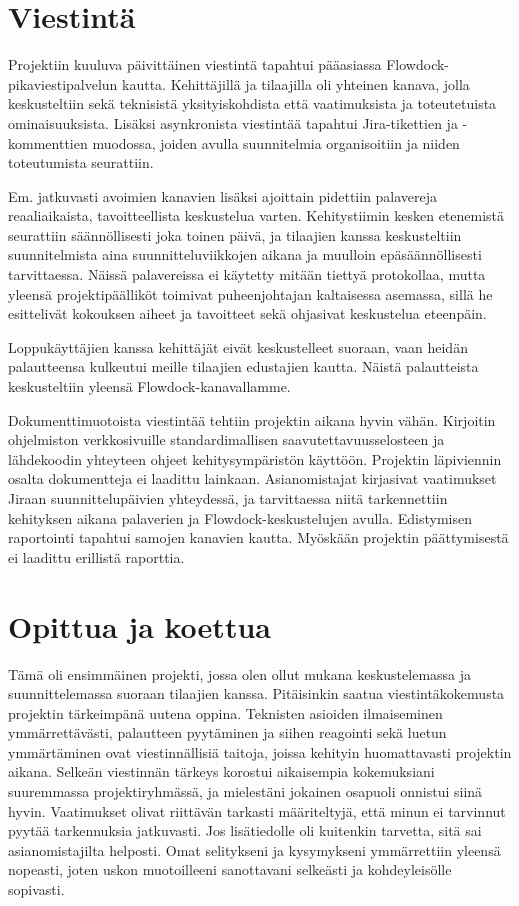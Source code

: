 \documentclass[11pt]{article}
\begin{document}
\section{Viestintä}

Projektiin kuuluva päivittäinen viestintä tapahtui pääasiassa
Flowdock-pikaviestipalvelun kautta. Kehittäjillä ja tilaajilla oli yhteinen
kanava, jolla keskusteltiin sekä teknisistä yksityiskohdista että vaatimuksista
ja toteutetuista ominaisuuksista. Lisäksi asynkronista vies\-tintää tapahtui
Jira-tikettien ja -kommenttien muodossa, joiden avulla suun\-nitelmia orga\-ni\-soitiin
ja niiden toteutumista seurattiin.

Em. jatkuvasti avoimien kanavien lisäksi ajoittain pidettiin palavereja
reaaliaikaista, tavoitteellista keskustelua varten. Kehitystiimin kesken
etenemistä seurattiin säännöllisesti joka toinen päivä, ja tilaajien kanssa
keskusteltiin suunnitelmista aina suunnitteluviikkojen ai\-ka\-na ja muulloin
epäsäännöllisesti tarvittaessa. Näissä palavereissa ei käytetty mitään tiettyä
protokollaa, mutta yleensä projektipäälliköt toimivat puheenjohtajan
kaltaisessa asemassa, sillä he esittelivät kokouksen aiheet ja tavoitteet sekä
ohjasivat keskustelua eteenpäin.

Loppukäyttäjien kanssa kehittäjät eivät keskustelleet suoraan, vaan heidän
palautteensa kulkeutui meille tilaajien edustajien kautta. Näistä palautteista
keskusteltiin yleensä Flow\-dock-kanavallamme.

Dokumenttimuotoista viestintää tehtiin projektin aikana hyvin vähän. Kirjoitin
ohjelmiston verkkosivuille standardimallisen saavutettavuusselosteen ja
lähdekoodin yhteyteen ohjeet kehitys\-ympä\-ris\-tön käyttöön. Projektin läpiviennin
osalta dokumentteja ei laadittu lain\-kaan. Asianomistajat kirjasivat vaatimukset
Jiraan suunnittelupäivien yhteydessä, ja tarvit\-taes\-sa niitä tarkennettiin
kehi\-tyk\-sen aikana palaverien ja Flow\-dock-keskustelujen avulla.
Edistymisen raportointi tapahtui samo\-jen kanavien kautta. Myöskään projektin
päättymi\-ses\-tä ei laadittu erillistä raporttia.

\section{Opittua ja koettua}

Tämä oli ensimmäinen projekti, jossa olen ollut mukana keskustelemassa ja
suunnittelemassa suoraan tilaajien kanssa. Pitäisinkin saatua viestintäkokemusta
projektin tärkeimpänä uutena oppina. Teknisten asioiden ilmaiseminen
ymmärrettävästi, palautteen pyytä\-minen ja siihen reagointi sekä luetun
ymmärtäminen ovat viestinnällisiä taitoja, joissa kehityin huomattavasti
projektin aikana. Sel\-keän viestinnän tärkeys korostui aikaisempia
kokemuksiani suuremmassa projektiryhmässä, ja mie\-les\-tä\-ni jokainen
osapuoli onnistui sii\-nä hyvin. Vaatimukset olivat riittävän tarkasti määriteltyjä,
että minun ei tarvinnut pyytää tarkennuksia jatkuvasti. Jos lisätiedolle
oli kuitenkin tarvetta, sitä sai asianomistajilta helposti. Omat selitykseni ja
kysymykseni ymmärrettiin yleensä nopeasti, joten uskon muotoilleeni sa\-not\-tavani
selkeästi ja kohdeyleisölle sopivasti.
\end{document}
